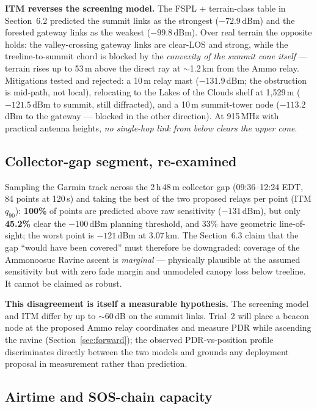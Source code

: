 \documentclass[11pt,letterpaper]{article}
\begin{document}
\textbf{ITM reverses the screening model.} The FSPL + terrain-class table in
Section~6.2 predicted the summit links as the strongest ($-72.9$\,dBm) and the
forested gateway links as the weakest ($-99.8$\,dBm). Over real terrain the opposite
holds: the valley-crossing gateway links are clear-LOS and strong, while the
treeline-to-summit chord is blocked by the \emph{convexity of the summit cone itself}
--- terrain rises up to 53\,m above the direct ray at $\sim$1.2\,km from the Ammo
relay. Mitigations tested and rejected: a 10\,m relay mast ($-131.9$\,dBm; the
obstruction is mid-path, not local), relocating to the Lakes of the Clouds shelf at
1{,}529\,m ($-121.5$\,dBm to summit, still diffracted), and a 10\,m summit-tower node
($-113.2$\,dBm to the gateway --- blocked in the other direction). At 915\,MHz with
practical antenna heights, \emph{no single-hop link from below clears the upper cone}.

\subsection{Collector-gap segment, re-examined}

Sampling the Garmin track across the 2\,h\,48\,m collector gap (09:36--12:24 EDT,
84 points at 120\,s) and taking the best of the two proposed relays per point (ITM
$q_{90}$): \textbf{100\%} of points are predicted above raw sensitivity
($-131$\,dBm), but only \textbf{45.2\%} clear the $-100$\,dBm planning threshold, and
33\% have geometric line-of-sight; the worst point is $-121$\,dBm at 3.07\,km. The
Section~6.3 claim that the gap ``would have been covered'' must therefore be
downgraded: coverage of the Ammonoosuc Ravine ascent is \emph{marginal} ---
physically plausible at the assumed sensitivity but with zero fade margin and
unmodeled canopy loss below treeline. It cannot be claimed as robust.

\textbf{This disagreement is itself a measurable hypothesis.} The screening model and
ITM differ by up to $\sim$60\,dB on the summit links. Trial~2 will place a beacon
node at the proposed Ammo relay coordinates and measure PDR while ascending the
ravine (Section~\ref{sec:forward}); the observed PDR-vs-position profile
discriminates directly between the two models and grounds any deployment proposal in
measurement rather than prediction.

\subsection{Airtime and SOS-chain capacity}
\end{document}
